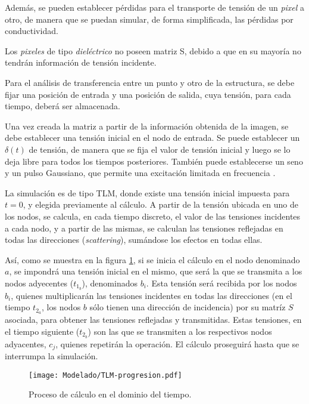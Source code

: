 \begin{enumerate}
	Además, se pueden establecer pérdidas para el transporte de tensión de un \textit{pixel} a otro, de manera que se puedan simular, de forma simplificada, las pérdidas por conductividad.
	
	Los \textit{pixeles} de tipo \textit{dieléctrico} no poseen matriz S, debido a que en su mayoría no tendrán información de tensión incidente.
\end{enumerate}


Para el análisis de transferencia entre un punto y otro de la estructura, se debe fijar una posición de entrada y una posición de salida, cuya tensión, para cada tiempo, deberá ser almacenada.

Una vez creada la matriz a partir de la información obtenida de la imagen, se debe establecer una tensión inicial en el nodo de entrada. Se puede establecer un $\delta(t)$ de tensión, de manera que se fija el valor de tensión inicial y luego se lo deja libre para todos los tiempos posteriores. También puede establecerse un seno y un pulso Gaussiano, que permite una excitación limitada en frecuencia \cite{Barthia:Handbook}.

La simulación es de tipo TLM, donde existe una tensión inicial impuesta para $t=0$, y elegida previamente al cálculo. A partir de la tensión ubicada en uno de los nodos, se calcula, en cada tiempo discreto, el valor de las tensiones incidentes a cada nodo, y a partir de las mismas, se calculan las tensiones reflejadas en todas las direcciones (\textit{scattering}), sumándose los efectos en todas ellas.

Así, como se muestra en la figura \ref{fig:procedimiento-tlm}, si se inicia el cálculo en el nodo denominado $a$, se impondrá una tensión inicial en el mismo, que será la que se transmita a los nodos adyecentes ($t_{1_b}$), denominados $b_i$. Esta tensión será recibida por los nodos $b_i$, quienes multiplicarán las tensiones incidentes en todas las direcciones (en el tiempo $t_{2_a}$, los nodos $b$ sólo tienen una dirección de incidencia) por su matríz $S$ asociada, para obtener las tensiones reflejadas y transmitidas. Estas tensiones, en el tiempo siguiente ($t_{2_b}$) son las que se transmiten a los respectivos nodos adyacentes, $c_j$, quienes repetirán la operación. El cálculo proseguirá hasta que se interrumpa la simulación.

\begin{figure}[h]
	\centering
	\texttt{[image: Modelado/TLM-progresion.pdf]}
	\caption{Proceso de cálculo en el dominio del tiempo.}
	\label{fig:procedimiento-tlm}
\end{figure}

